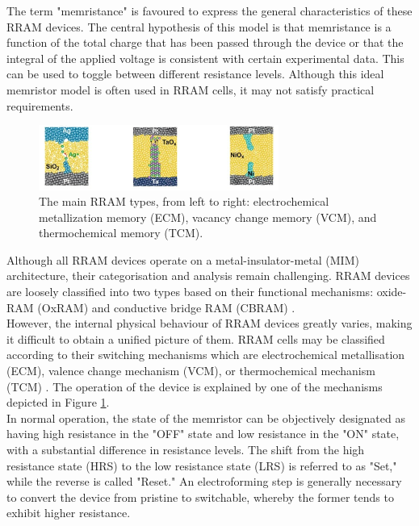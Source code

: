 \noindent The term "memristance" is favoured to express the general characteristics of these RRAM devices. The central hypothesis of this model is that memristance is a function of the total charge that has been passed through the device or that the integral of the applied voltage is consistent with certain experimental data. This can be used to toggle between different resistance levels. Although this ideal memristor model is often used in RRAM cells, it may not satisfy practical requirements. 

\begin{figure}[htbp!] 
    \centering    
    \includegraphics[width=0.7\textwidth]{Chapter2/Figs/g.png}
    \caption[The main RRAM types.]{The main RRAM types, from left to right: electrochemical metallization memory (ECM), vacancy change memory (VCM), and thermochemical memory (TCM). \cite{goux2016electrochemical}}
    \label{fig:2g}
\end{figure} 

\noindent Although all RRAM devices operate on a metal-insulator-metal (MIM) architecture, their categorisation and analysis remain challenging. RRAM devices are loosely classified into two types based on their functional mechanisms: oxide-RAM (OxRAM) and conductive bridge RAM (CBRAM) \cite{liu2015categorization}. \\

\noindent However, the internal physical behaviour of RRAM devices greatly varies, making it difficult to obtain a unified picture of them. RRAM cells may be classified according to their switching mechanisms which are electrochemical metallisation (ECM), valence change mechanism (VCM), or thermochemical mechanism (TCM) \cite{goux2016electrochemical}. The operation of the device is explained by one of the mechanisms depicted in Figure \ref{fig:2g}. \\

\noindent In normal operation, the state of the memristor can be objectively designated as having high resistance in the "OFF" state and low resistance in the "ON" state, with a substantial difference in resistance levels. The shift from the high resistance state (HRS) to the low resistance state (LRS) is referred to as "Set," while the reverse is called "Reset." An electroforming step is generally necessary to convert the device from pristine to switchable, whereby the former tends to exhibit higher resistance. \\

